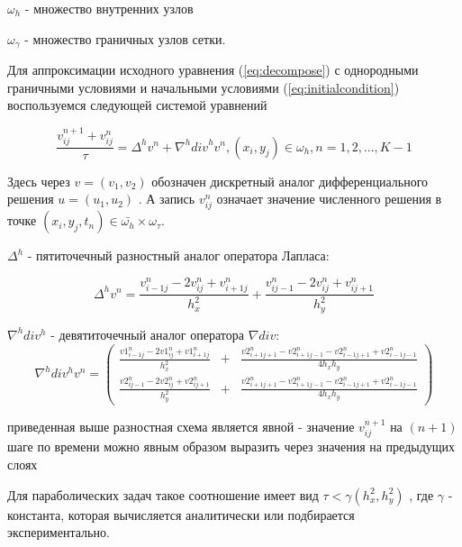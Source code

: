 \documentclass[12pt,a4paper]{scrartcl}
\begin{document}
$\omega_h$ - множество внутренних узлов

$\omega_{\gamma}$ - множество граничных узлов сетки.

    Для аппроксимации исходного уравнения (\ref{eq:decompose}) с однородными граничными условиями и начальными условиями (\ref{eq:initialcondition}) воспользуемся следующей системой уравнений

\begin{equation}
    \label{eq:system}
        \frac{v_{ij}^{n+1} + v_{ij}^n}{\tau} = \Delta^hv^n + \nabla^h{div}^hv^n, (x_i, y_j) \in \omega_h, n = 1,2,...,K-1
\end{equation}

Здесь через $v = (v_1, v_2)$ обозначен дискретный аналог дифференциального решения $u = (u_1, u_2)$ . А запись
$v_{ij}^n$ означает значение численного решения в точке $(x_i,y_j,t_n) \in \bar{\omega_h} \times \omega_{\tau}$.

$\Delta^h$ - пятиточечный разностный аналог оператора Лапласа:

\begin{equation}
    \label{eq:laplas}
        \Delta^hv^n = \frac{v_{i-1j}^n - 2v_{ij}^n + v_{i+1j}^n}{h_x^2} + \frac{v_{ij-1}^n - 2v_{ij}^n + v_{ij+1}^n}{h_y^2}
\end{equation}



$\nabla^hdiv^h$ - девятиточечный аналог оператора $\nabla div$:
\begin{equation}
    \label{eq:nabladiv}
        \nabla^hdiv^hv^n  = 
        \left(
            \begin{array}{lcr} 
                \frac{v1_{i-1j}^n - 2v1_{ij}^n + v1_{i+1j}^n}{h_x^2} & + & \frac{v2_{i+1j+1}^n - v2_{i+1j-1}^n - v2_{i-1j+1}^n + v2_{i-1j-1}^n}{4h_xh_y} \\
                \frac{v2_{ij-1}^n - 2v2_{ij}^n + v2_{ij+1}^n}{h_y^2} & + & \frac{v2_{i+1j+1}^n - v2_{i+1j-1}^n - v2_{i-1j+1}^n + v2_{i-1j-1}^n}{4h_xh_y} 
     \end{array}\right)
\end{equation}

приведенная выше разностная схема является явной - значение $v_{ij}^{n+1}$ на $(n+1)$ шаге по времени можно явным образом выразить через значения на предыдущих слоях

Для параболических задач такое соотношение имеет вид $\tau < \gamma(h_x^2, h_y^2)$ , где $\gamma$ - константа, которая вычисляется аналитически или подбирается экспериментально.
\end{document}
